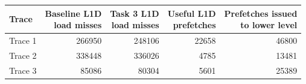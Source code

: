 \begin{tabular}{lrrrr}
\toprule
Trace & \shortstack{Baseline L1D\\load misses} & \shortstack{Task 3 L1D\\load misses} & \shortstack{Useful L1D\\prefetches} & \shortstack{Prefetches issued\\to lower level} \\
\midrule
Trace 1 & 266950 & 248106 & 22658 & 46800 \\
Trace 2 & 338448 & 336026 & 4785 & 13481 \\
Trace 3 & 85086 & 80304 & 5601 & 25389 \\
\bottomrule
\end{tabular}
